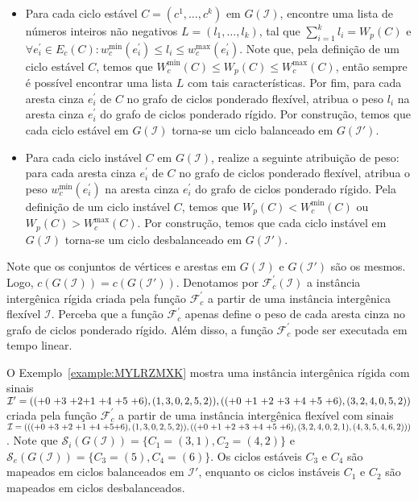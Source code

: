 \begin{itemize}
  \item Para cada ciclo estável $C=(c^1,\dots,c^k)$ em $G(\mathcal{I})$, encontre uma lista de números inteiros não negativos $L=(l_1,\dots,l_k)$, tal que $\sum_{i=1}^{k}l_i = W_p(C)$ e $\forall e^{\prime}_i \in E_c(C): w^{\min}_c(e^{\prime}_i) \le l_i \le w^{\max}_c(e^{\prime}_i)$. Note que, pela definição de um ciclo estável $C$, temos que $W^{\min}_c(C) \le W_p(C) \le W^{\max}_c(C)$, então sempre é possível encontrar uma lista $L$ com tais características. Por fim, para cada aresta cinza $e^{\prime}_i$ de $C$ no grafo de ciclos ponderado flexível, atribua o peso $l_i$ na aresta cinza $e^{\prime}_i$ do grafo de ciclos ponderado rígido. Por construção, temos que cada ciclo estável em $G(\mathcal{I})$ torna-se um ciclo balanceado em $G(\mathcal{I}')$.
  \item Para cada ciclo instável $C$ em $G(\mathcal{I})$, realize a seguinte atribuição de peso: para cada aresta cinza $e^{\prime}_i$ de $C$ no grafo de ciclos ponderado flexível, atribua o peso $w^{\min}_c(e^{\prime}_i)$ na aresta cinza $e^{\prime}_i$ do grafo de ciclos ponderado rígido. Pela definição de um ciclo instável $C$, temos que $W_p(C)  < W^{\min}_c(C)$ ou $W_p(C) > W^{\max}_c(C)$. Por construção, temos que cada ciclo instável em $G(\mathcal{I})$ torna-se um ciclo desbalanceado em $G(\mathcal{I}')$.
\end{itemize}

Note que os conjuntos de vértices e arestas em $G(\mathcal{I})$ e $G(\mathcal{I}')$ são os mesmos. Logo, $c(G(\mathcal{I})) = c(G(\mathcal{I}'))$. Denotamos por $\mathcal{F}_{c}^{'}(\mathcal{I})$ a instância intergênica rígida criada pela função $\mathcal{F}_{c}^{'}$ a partir de uma instância intergênica flexível $\mathcal{I}$. Perceba que a função $\mathcal{F}_{c}^{'}$ apenas define o peso de cada aresta cinza no grafo de ciclos ponderado rígido. Além disso, a função $\mathcal{F}_{c}^{'}$ pode ser executada em tempo linear.

\pagebreak

O Exemplo~\ref{example:MYLRZMXK} mostra uma instância intergênica rígida com sinais $\mathcal{I}' = (({+0}~{+3}~{+2}\break{+1}~{+4}~{+5}~{+6}),(1,3,0,2,5,2)),(({+0}~{+1}~{+2}~{+3}~{+4}~{+5}~{+6}),(3,2,4,0,5,2))$ criada pela função $\mathcal{F}_{c}^{'}$ a partir de uma instância intergênica flexível com sinais $\mathcal{I} = ((({+0}~{+3}~{+2}~{+1}~{+4}~{+5}\break{+6}),(1,3,0,2,5,2)),(({+0}~{+1}~{+2}~{+3}~{+4}~{+5}~{+6}),(3,2,4,0,2,1),(4,3,5,4,6,2)))$. Note que $\mathcal{S}_i(G(\mathcal{I})) = \{C_1=(3,1),C_2=(4,2)\}$ e $\mathcal{S}_e(G(\mathcal{I})) = \{C_3=(5),C_4=(6)\}$. Os ciclos estáveis $C_3$ e $C_4$ são mapeados em ciclos balanceados em $\mathcal{I}'$, enquanto os ciclos instáveis $C_1$ e $C_2$ são mapeados em ciclos desbalanceados.


